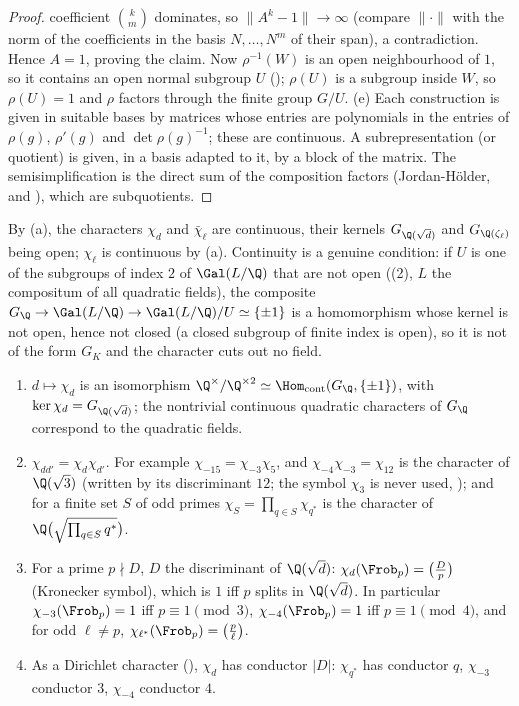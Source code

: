 \begin{proof}
coefficient $\binom km$ dominates, so $\|A^k-1\|\to\infty$ (compare $\|\cdot\|$ with the norm of the coefficients in the basis $N,\dots,N^m$ of their span), a
contradiction. Hence $A=1$, proving the claim. Now $\rho^{-1}(W)$ is an open neighbourhood of $1$, so it contains an open normal subgroup $U$ (); $\rho(U)$
is a subgroup inside $W$, so $\rho(U)=1$ and $\rho$ factors through the finite group $G/U$.
(e) Each construction is given in suitable bases by matrices whose entries are polynomials in the entries of $\rho(g)$, $\rho'(g)$ and $\det\rho(g)^{-1}$; these are
continuous. A subrepresentation (or quotient) is given, in a basis adapted to it, by a block of the matrix. The semisimplification is the direct sum of the
composition factors (Jordan-H\"older,  and ), which are subquotients.
\end{proof}

By (a), the characters $\chi_d$ and $\bar\chi_\ell$ are continuous, their kernels $G_{\Q(\sqrt d)}$ and $G_{\Q(\zeta_\ell)}$ being open; $\chi_\ell$ is continuous
by (a). Continuity is a genuine condition: if $U$ is one of the subgroups of index $2$ of $\Gal(L/\Q)$ that are not open
((2), $L$ the compositum of all quadratic fields), the composite $G_\Q\to\Gal(L/\Q)\to\Gal(L/\Q)/U\simeq\{\pm1\}$ is a homomorphism whose kernel
is not open, hence not closed (a closed subgroup of finite index is open), so it is not of the form $G_K$ and the character cuts out no field.

\begin{proposition}\label{prop:galois:quadratic-characters}
\begin{enumerate}[label=(\alph*)]
\item $d\mapsto\chi_d$ is an isomorphism $\Q^\times/\Q^{\times2}\simeq\Hom_{\mathrm{cont}}(G_\Q,\{\pm1\})$, with $\ker\chi_d=G_{\Q(\sqrt d)}$; the nontrivial continuous quadratic
characters of $G_\Q$ correspond to the quadratic fields.
\item $\chi_{dd'}=\chi_d\chi_{d'}$. For example $\chi_{-15}=\chi_{-3}\chi_5$, and $\chi_{-4}\chi_{-3}=\chi_{12}$ is the character of $\Q(\sqrt3)$ (written by its discriminant $12$;
the symbol $\chi_3$ is never used, ); and for a finite set $S$ of odd primes $\chi_S=\prod_{q\in S}\chi_{q^*}$ is the character of $\Q\bigl(\sqrt{\prod_{q\in S}q^*}\bigr)$.
\item For a prime $p\nmid D$, $D$ the discriminant of $\Q(\sqrt d)$: $\chi_d(\Frob_p)=\bigl(\frac Dp\bigr)$ (Kronecker symbol), which is $1$ iff $p$ splits in $\Q(\sqrt d)$. In
particular $\chi_{-3}(\Frob_p)=1$ iff $p\equiv1\pmod3$, $\chi_{-4}(\Frob_p)=1$ iff $p\equiv1\pmod4$, and for odd $\ell\ne p$, $\chi_{\ell^*}(\Frob_p)=\bigl(\frac p\ell\bigr)$.
\item As a Dirichlet character (), $\chi_d$ has conductor $|D|$: $\chi_{q^*}$ has conductor $q$, $\chi_{-3}$ conductor $3$, $\chi_{-4}$ conductor $4$.
\end{enumerate}
\end{proposition}

